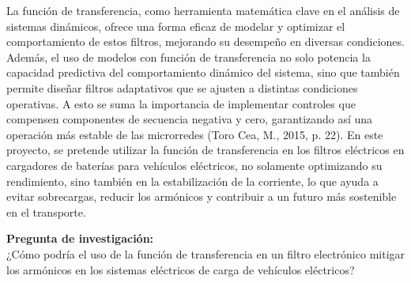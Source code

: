 La función de transferencia, como herramienta matemática clave en el análisis de sistemas dinámicos, ofrece una forma eficaz de modelar y optimizar el comportamiento de estos filtros, mejorando su desempeño en diversas condiciones. Además, el uso de modelos con función de transferencia no solo potencia la capacidad predictiva del comportamiento dinámico del sistema, sino que también permite diseñar filtros adaptativos que se ajusten a distintas condiciones operativas. A esto se suma la importancia de implementar controles que compensen componentes de secuencia negativa y cero, garantizando así una operación más estable de las microrredes (Toro Cea, M., 2015, p. 22). En este proyecto, se pretende utilizar la función de transferencia en los filtros eléctricos en cargadores de baterías para vehículos eléctricos, no solamente optimizando su rendimiento, sino también en la estabilización de la corriente, lo que ayuda a evitar sobrecargas, reducir los armónicos y contribuir a un futuro más sostenible en el transporte.

\vspace{1cm}
\noindent\textbf{Pregunta de investigación:} \\
¿Cómo podría el uso de la función de transferencia en un filtro electrónico mitigar los armónicos en los sistemas eléctricos de carga de vehículos eléctricos?